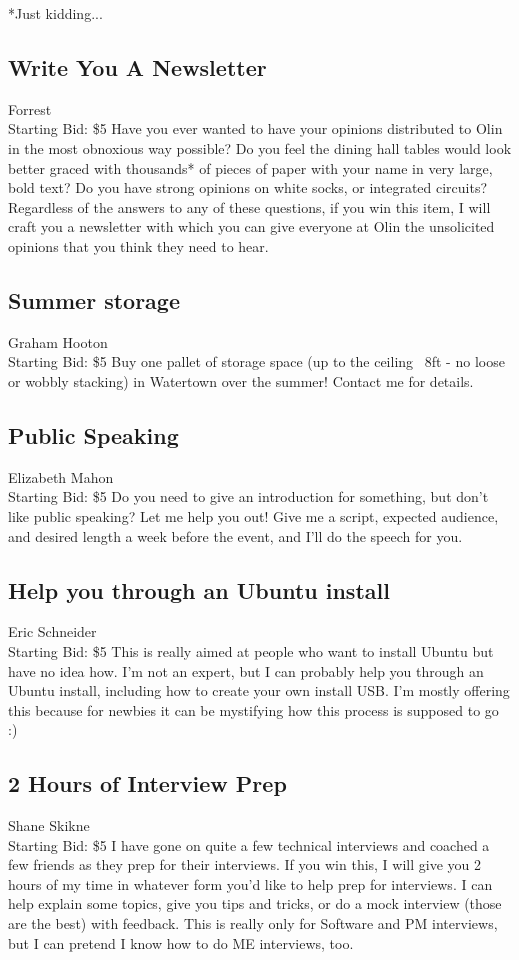 \documentclass[11pt]{article}
\begin{document}
*Just kidding...
\subsection{Write You A Newsletter}
Forrest
\\
Starting Bid: \$5
\newline
Have you ever wanted to have your opinions distributed to Olin in the most obnoxious way possible? Do you feel the dining hall tables would look better graced with thousands* of pieces of paper with your name in very large, bold text? Do you have strong opinions on white socks, or integrated circuits? Regardless of the answers to any of these questions, if you win this item, I will craft you a newsletter with which you can give everyone at Olin the unsolicited opinions that you think they need to hear.
\subsection{Summer storage}
Graham Hooton
\\
Starting Bid: \$5
\newline
Buy one pallet of storage space (up to the ceiling ~8ft - no loose or wobbly stacking) in Watertown over the summer! Contact me for details.
\subsection{Public Speaking}
Elizabeth Mahon
\\
Starting Bid: \$5
\newline
Do you need to give an introduction for something, but don't like public speaking? Let me help you out! Give me a script, expected audience, and desired length a week before the event, and I'll do the speech for you.
\subsection{Help you through an Ubuntu install}
Eric Schneider
\\
Starting Bid: \$5
\newline
This is really aimed at people who want to install Ubuntu but have no idea how. I'm not an expert, but I can probably help you through an Ubuntu install, including how to create your own install USB. I'm mostly offering this because for newbies it can be mystifying how this process is supposed to go :)
\subsection{2 Hours of Interview Prep}
Shane Skikne
\\
Starting Bid: \$5
\newline
I have gone on quite a few technical interviews and coached a few friends as they prep for their interviews. If you win this, I will give you 2 hours of my time in whatever form you'd like to help prep for interviews. I can help explain some topics, give you tips and tricks, or do a mock interview (those are the best) with feedback. This is really only for Software and PM interviews, but I can pretend I know how to do ME interviews, too.
\end{document}
